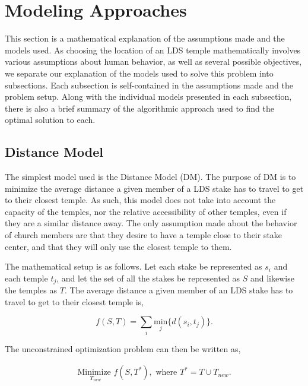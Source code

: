 \documentclass[twoside,twocolumn]{article}
\begin{document}
\section{Modeling Approaches}
\label{sec:models}
This section is a mathematical explanation of the assumptions made and the models used. As choosing the location of an LDS temple mathematically involves various assumptions about human behavior, as well as several possible objectives, we separate our explanation of the models used to solve this problem into subsections. Each subsection is self-contained in the assumptions made and the problem setup. Along with the individual models presented in each subsection, there is also a brief summary of the algorithmic approach used to find the optimal solution to each.

\subsection{Distance Model} 

The simplest model used is the Distance Model (DM). The purpose of DM is to minimize the average distance a given member of a LDS stake has to travel to get to their closest temple. As such, this model does not take into account the capacity of the temples, nor the relative accessibility of other temples, even if they are a similar distance away. The only assumption made about the behavior of church members are that they desire to have a temple close to their stake center, and that they will only use the closest temple to them.

The mathematical setup is as follows. Let each stake be represented as $s_i$ and each temple $t_j$, and let the set of all the stakes be represented as $S$ and likewise the temples as $T$. The average distance a given member of an LDS stake has to travel to get to their closest temple is, 

\begin{equation}
	f(S,T) = \sum_i \underset{j}{\text{min}}\{d(s_i,t_j)\}.
\end{equation}

The unconstrained optimization problem can then be written as,

\begin{equation}
\begin{aligned}
	\underset{T_{new}}{\text{Minimize }} f(S,T^*), \text{ where } T^* = T \cup T_{new}.
\end{aligned}
\end{equation}
\end{document}
